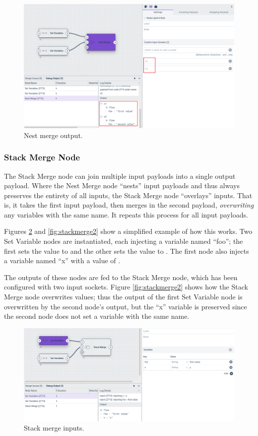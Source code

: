 \begin{figure}
	\includegraphics[width=0.85\linewidth]{images/nestmerge2.png}
	\caption{Nest merge output.}
	\label{fig:nestmerge2}
\end{figure}

\subsubsection{Stack Merge Node}
The Stack Merge node can join multiple input payloads into a single output payload. Where the Nest Merge node ``nests'' input payloads and thus always preserves the entirety of all inputs, the Stack Merge node ``overlays'' inputs. That is, it takes the first input payload, then merges in the second payload, \emph{overwriting} any variables with the same name. It repeats this process for all input payloads.

Figures \ref{fig:stackmerge1} and \ref{fig:stackmerge2} show a simplified example of how this works. Two Set Variable nodes are instantiated, each injecting a variable named ``foo''; the first sets the value to  and the other sets the value to . The first node also injects a variable named ``x'' with a value of .

The outputs of these nodes are fed to the Stack Merge node, which has been configured with two input sockets. Figure \ref{fig:stackmerge2} shows how the Stack Merge node overwrites values; thus the  output of the first Set Variable node is overwritten by the second node's  output, but the ``x'' variable is preserved since the second node does not set a variable with the same name.

\begin{figure}
	\includegraphics[width=0.85\linewidth]{images/stackmerge1.png}
	\caption{Stack merge inputs.}
	\label{fig:stackmerge1}
\end{figure}

